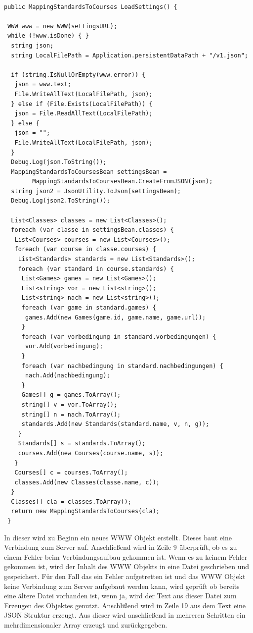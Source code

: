 \begin{scriptsize}
\lstset{
	float,
	caption=Methode LoadSettings, 
	language=[Sharp]C, 
	frame=single,  
	showstringspaces=false, 
	showspaces=false, 
	numbers=left, 
	captionpos=b, 
	belowcaptionskip=4pt,
	basicstyle=\ttfamily
} 
\begin{lstlisting}[label=lst:methode3]

public MappingStandardsToCourses LoadSettings() {

 WWW www = new WWW(settingsURL);
 while (!www.isDone) { }
  string json;
  string LocalFilePath = Application.persistentDataPath + "/v1.json";

  if (string.IsNullOrEmpty(www.error)) {
   json = www.text;
   File.WriteAllText(LocalFilePath, json);
  } else if (File.Exists(LocalFilePath)) {
   json = File.ReadAllText(LocalFilePath);
  } else {
   json = "";                
   File.WriteAllText(LocalFilePath, json);
  }
  Debug.Log(json.ToString());
  MappingStandardsToCoursesBean settingsBean = 
  		MappingStandardsToCoursesBean.CreateFromJSON(json);
  string json2 = JsonUtility.ToJson(settingsBean);
  Debug.Log(json2.ToString());

  List<Classes> classes = new List<Classes>();
  foreach (var classe in settingsBean.classes) {
   List<Courses> courses = new List<Courses>();
   foreach (var course in classe.courses) {
    List<Standards> standards = new List<Standards>();
    foreach (var standard in course.standards) {
     List<Games> games = new List<Games>();
     List<string> vor = new List<string>();
     List<string> nach = new List<string>();
     foreach (var game in standard.games) {
      games.Add(new Games(game.id, game.name, game.url));
     }
     foreach (var vorbedingung in standard.vorbedingungen) {
      vor.Add(vorbedingung);
     }
     foreach (var nachbedingung in standard.nachbedingungen) {
      nach.Add(nachbedingung);
     }
     Games[] g = games.ToArray();
     string[] v = vor.ToArray();
     string[] n = nach.ToArray();
     standards.Add(new Standards(standard.name, v, n, g));
    }
    Standards[] s = standards.ToArray();
    courses.Add(new Courses(course.name, s));
   }
   Courses[] c = courses.ToArray();
   classes.Add(new Classes(classe.name, c));
  }
  Classes[] cla = classes.ToArray();
  return new MappingStandardsToCourses(cla);
 }
\end{lstlisting}
\end{scriptsize}

In dieser wird zu Beginn ein neues WWW Objekt erstellt. Dieses baut eine Verbindung zum Server auf. Anschließend wird in Zeile 9 überprüft, ob es zu einem Fehler beim Verbindungsaufbau gekommen ist. Wenn es zu keinem Fehler gekommen ist, wird der Inhalt des WWW Objekts in eine Datei geschrieben und gespeichert. Für den Fall das ein Fehler aufgetretten ist und das WWW Objekt keine Verbindung zum Server aufgebaut werden kann, wird geprüft ob bereits eine ältere Datei vorhanden ist, wenn ja, wird der Text aus dieser Datei zum Erzeugen des Objektes genutzt. Anschlißend wird in Zeile 19 aus dem Text eine JSON Struktur erzeugt. Aus dieser wird anschließend in mehreren Schritten ein mehrdimensionaler Array erzeugt und zurückgegeben.

